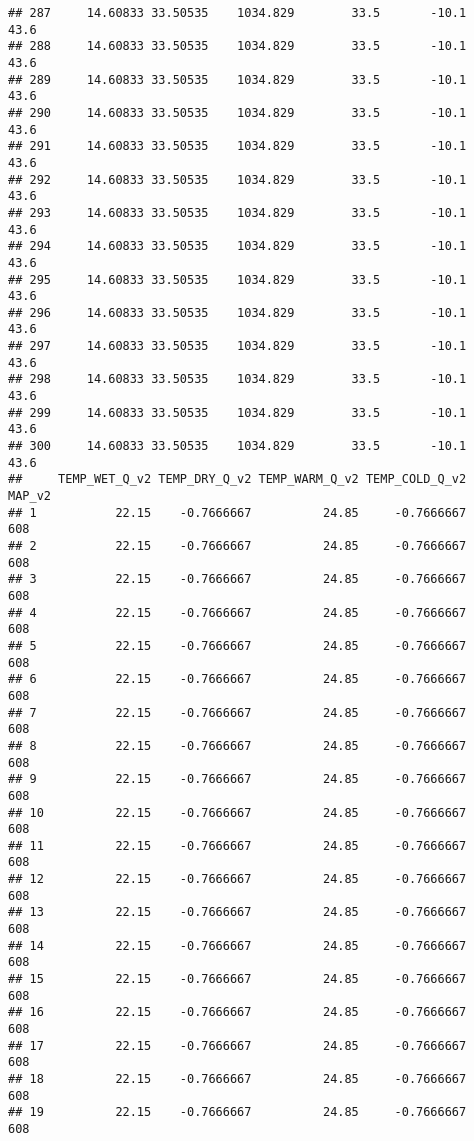 \documentclass[]{article}
\begin{document}
\begin{verbatim}
## 287     14.60833 33.50535    1034.829        33.5       -10.1              43.6
## 288     14.60833 33.50535    1034.829        33.5       -10.1              43.6
## 289     14.60833 33.50535    1034.829        33.5       -10.1              43.6
## 290     14.60833 33.50535    1034.829        33.5       -10.1              43.6
## 291     14.60833 33.50535    1034.829        33.5       -10.1              43.6
## 292     14.60833 33.50535    1034.829        33.5       -10.1              43.6
## 293     14.60833 33.50535    1034.829        33.5       -10.1              43.6
## 294     14.60833 33.50535    1034.829        33.5       -10.1              43.6
## 295     14.60833 33.50535    1034.829        33.5       -10.1              43.6
## 296     14.60833 33.50535    1034.829        33.5       -10.1              43.6
## 297     14.60833 33.50535    1034.829        33.5       -10.1              43.6
## 298     14.60833 33.50535    1034.829        33.5       -10.1              43.6
## 299     14.60833 33.50535    1034.829        33.5       -10.1              43.6
## 300     14.60833 33.50535    1034.829        33.5       -10.1              43.6
##     TEMP_WET_Q_v2 TEMP_DRY_Q_v2 TEMP_WARM_Q_v2 TEMP_COLD_Q_v2 MAP_v2
## 1           22.15    -0.7666667          24.85     -0.7666667    608
## 2           22.15    -0.7666667          24.85     -0.7666667    608
## 3           22.15    -0.7666667          24.85     -0.7666667    608
## 4           22.15    -0.7666667          24.85     -0.7666667    608
## 5           22.15    -0.7666667          24.85     -0.7666667    608
## 6           22.15    -0.7666667          24.85     -0.7666667    608
## 7           22.15    -0.7666667          24.85     -0.7666667    608
## 8           22.15    -0.7666667          24.85     -0.7666667    608
## 9           22.15    -0.7666667          24.85     -0.7666667    608
## 10          22.15    -0.7666667          24.85     -0.7666667    608
## 11          22.15    -0.7666667          24.85     -0.7666667    608
## 12          22.15    -0.7666667          24.85     -0.7666667    608
## 13          22.15    -0.7666667          24.85     -0.7666667    608
## 14          22.15    -0.7666667          24.85     -0.7666667    608
## 15          22.15    -0.7666667          24.85     -0.7666667    608
## 16          22.15    -0.7666667          24.85     -0.7666667    608
## 17          22.15    -0.7666667          24.85     -0.7666667    608
## 18          22.15    -0.7666667          24.85     -0.7666667    608
## 19          22.15    -0.7666667          24.85     -0.7666667    608

\end{verbatim}
\end{document}
